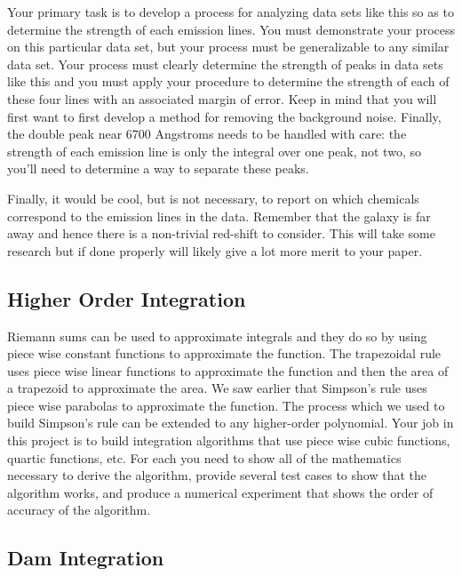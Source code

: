 \documentclass[
]{book}
\theoremstyle{definition}
\theoremstyle{definition}
\theoremstyle{definition}
\theoremstyle{remark}
\begin{document}
Your primary task is to develop a process for analyzing data sets like
this so as to determine the strength of each emission lines. You must
demonstrate your process on this particular data set, but your process
must be generalizable to any similar data set. Your process must clearly
determine the strength of peaks in data sets like this and you must
apply your procedure to determine the strength of each of these four
lines with an associated margin of error. Keep in mind that you will
first want to first develop a method for removing the background noise.
Finally, the double peak near \(6700\) Angstroms needs to be handled with
care: the strength of each emission line is only the integral over one
peak, not two, so you'll need to determine a way to separate these
peaks.

Finally, it would be cool, but is not necessary, to report on which
chemicals correspond to the emission lines in the data. Remember that
the galaxy is far away and hence there is a non-trivial red-shift to
consider. This will take some research but if done properly will likely
give a lot more merit to your paper.

\hypertarget{higher-order-integration}{%
\subsection{Higher Order Integration}\label{higher-order-integration}}

Riemann sums can be used to approximate integrals and they do so by
using piece wise constant functions to approximate the function. The
trapezoidal rule uses piece wise linear functions to approximate the
function and then the area of a trapezoid to approximate the area. We
saw earlier that Simpson's rule uses piece wise parabolas to approximate
the function. The process which we used to build Simpson's rule can be
extended to any higher-order polynomial. Your job in this project is to
build integration algorithms that use piece wise cubic functions, quartic
functions, etc. For each you need to show all of the mathematics
necessary to derive the algorithm, provide several test cases to show
that the algorithm works, and produce a numerical experiment that shows
the order of accuracy of the algorithm.

\hypertarget{dam-integration}{%
\subsection{Dam Integration}\label{dam-integration}}
\end{document}
